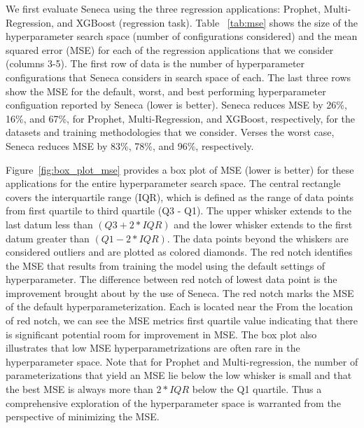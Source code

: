 We first evaluate Seneca using the three regression applications: Prophet,
Multi-Regression, and XGBoost (regression task).  Table ~\ref{tab:mse} shows
the size of the hyperparameter search space (number of configurations
considered) and the mean squared error (MSE) for each of the regression
applications that we consider (columns 3-5).  The first row of data is the
number of hyperparameter configurations that Seneca considers in search space
of each.  The last three rows show the MSE for the default, worst, and best
performing hyperparameter configuation reported by Seneca (lower is better).
Seneca reduces MSE by 26\%, 16\%, and 67\%, for Prophet, Multi-Regression, and
XGBoost, respectively, for the datasets and training methodologies that we
consider.  Verses the worst case, Seneca reduces MSE by 83\%, 78\%, and 96\%,
respectively.

Figure~\ref{fig:box_plot_mse} provides a box plot of MSE (lower is better)
for these applications 
for the entire hyperparameter search space. The central rectangle covers the interquartile range (IQR), 
which is defined as the range of data 
points from first quartile to third quartile (Q3 - Q1). 
The upper whisker extends to the last datum less 
than \texttt{$(Q3 + 2 * IQR)$} and the lower whisker extends to the first datum greater 
than \texttt{$(Q1 - 2 * IQR)$}. The data points beyond the whiskers are considered outliers 
and are plotted as colored diamonds. The red notch identifies the MSE that results from training 
the model using the default settings of hyperparameter. 
The difference between red notch of lowest data 
point is the improvement brought about by the use of Seneca. 
The red notch marks the MSE of the default hyperparameterization.
Each is located near the 
From the location of red notch, we can see the MSE metrics 
first quartile value indicating that there is significant 
potential room for improvement in MSE. The box plot also illustrates 
that low MSE hyperparametrizations are often rare in the hyperparameter space.
Note that for Prophet and Multi-regression, the number of parameterizations that
yield an MSE lie below the low whisker is small and that the best MSE is
always more than $2 * IQR$ below the Q1 quartile.  Thus a comprehensive
exploration of the hyperparameter space is warranted from the perspective of
minimizing the MSE.   


